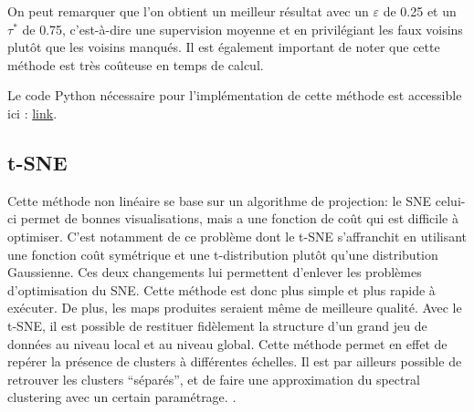 On peut remarquer que l'on obtient un meilleur résultat avec un $\varepsilon$ de 0.25 et un $\tau^*$ de 0.75, c'est-à-dire une supervision moyenne et en privilégiant les faux voisins plutôt que les voisins manqués.
Il est également important de noter que cette méthode est très coûteuse en temps de calcul. 

Le code Python nécessaire pour l'implémentation de cette méthode est accessible ici : \href{https://zenodo.org/record/4094851#.YaxeoS_pO-w}{link}.


\subsection{t-SNE}

Cette méthode non linéaire se base sur un algorithme de projection: le SNE \cite{hinton2002-SNE} celui-ci permet de bonnes visualisations, mais a une fonction de coût qui est difficile à optimiser. C’est notamment de ce problème dont le t-SNE s’affranchit en utilisant une fonction coût symétrique  et une t-distribution plutôt qu’une distribution Gaussienne. 
Ces deux changements lui  permettent d’enlever les problèmes d’optimisation du SNE. Cette méthode est donc plus simple et plus rapide à exécuter. De plus, les maps produites seraient même de meilleure qualité\cite{van2008TSNE}.
\smallskip
Avec le t-SNE, il est possible de restituer fidèlement la structure d’un grand jeu de données au niveau local et au niveau global. Cette méthode permet en effet de repérer la présence de clusters à différentes échelles. Il est par ailleurs possible de retrouver les clusters “séparés”, et de faire une approximation du spectral clustering avec un certain paramétrage. \cite{linderman2019Spectral1} \cite{chui2006Spectral2} \cite{von2007SpectralClustering}.
\smallskip

